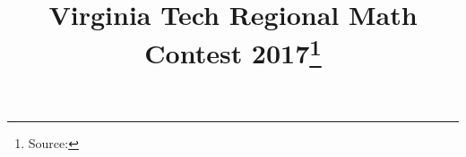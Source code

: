 \documentclass[10pt]{article}
\begin{document}
\title{Virginia Tech Regional Math Contest 2017\footnote{Source: \source}}
\author{\vspace{-2ex}}
\date{\vspace{-6ex}} %
\maketitle







\end{document}
